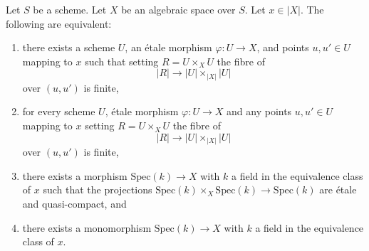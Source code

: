 \begin{lemma}
\label{lemma-R-finite-above-x}
Let $S$ be a scheme. Let $X$ be an algebraic space over $S$.
Let $x \in |X|$. The following are equivalent:
\begin{enumerate}
\item there exists a scheme $U$, an \'etale morphism
$\varphi : U \to X$, and points $u, u' \in U$ mapping to
$x$ such that setting $R = U \times_X U$ the fibre of
$$
|R| \to |U| \times_{|X|} |U|
$$
over $(u, u')$ is finite,
\item for every scheme $U$, \'etale morphism $\varphi : U \to X$ and
any points $u, u' \in U$ mapping to
$x$ setting $R = U \times_X U$ the fibre of
$$
|R| \to |U| \times_{|X|} |U|
$$
over $(u, u')$ is finite,
\item there exists a morphism $\text{Spec}(k) \to X$ with $k$ a field
in the equivalence class of $x$ such that the projections
$\text{Spec}(k) \times_X \text{Spec}(k) \to \text{Spec}(k)$ are
\'etale and quasi-compact, and
\item there exists a monomorphism $\text{Spec}(k) \to X$ with $k$ a field
in the equivalence class of $x$.
\end{enumerate}
\end{lemma}


